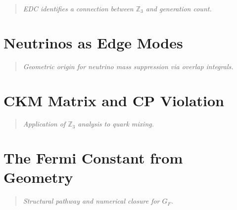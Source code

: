 \documentclass[11pt,a4paper]{book}
\theoremstyle{definition}
\theoremstyle{remark}
\begin{document}
\begin{quote}
\textit{EDC identifies a connection between $\mathbb{Z}_3$ and generation count.}
\end{quote}



\chapter{Neutrinos as Edge Modes}
\label{ch:neutrinos_edge}

\begin{quote}
\textit{Geometric origin for neutrino mass suppression via overlap integrals.}
\end{quote}



\chapter{CKM Matrix and CP Violation}
\label{ch:ckm_cp}

\begin{quote}
\textit{Application of $\mathbb{Z}_3$ analysis to quark mixing.}
\end{quote}



\chapter{The Fermi Constant from Geometry}
\label{ch:gf_derivation}

\begin{quote}
\textit{Structural pathway and numerical closure for $G_F$.}
\end{quote}



\end{document}
